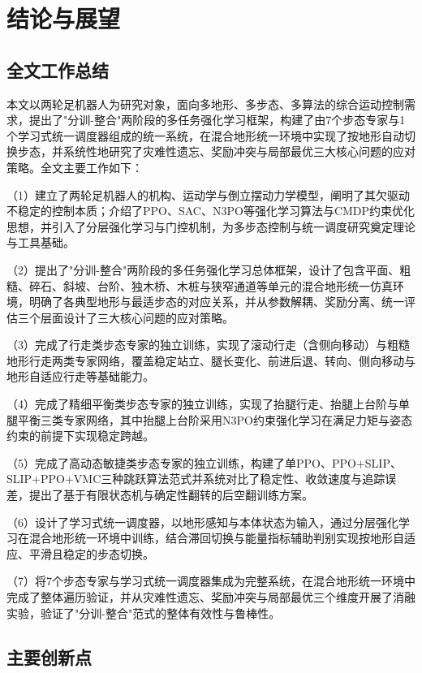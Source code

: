 
\chapter[结论与展望]{结论与展望}

\section{全文工作总结}

本文以两轮足机器人为研究对象，面向多地形、多步态、多算法的综合运动控制需求，提出了"分训-整合"两阶段的多任务强化学习框架，构建了由7个步态专家与1个学习式统一调度器组成的统一系统，在混合地形统一环境中实现了按地形自动切换步态，并系统性地研究了灾难性遗忘、奖励冲突与局部最优三大核心问题的应对策略。全文主要工作如下：

（1）建立了两轮足机器人的机构、运动学与倒立摆动力学模型，阐明了其欠驱动不稳定的控制本质；介绍了PPO、SAC、N3PO等强化学习算法与CMDP约束优化思想，并引入了分层强化学习与门控机制，为多步态控制与统一调度研究奠定理论与工具基础。

（2）提出了"分训-整合"两阶段的多任务强化学习总体框架，设计了包含平面、粗糙、碎石、斜坡、台阶、独木桥、木桩与狭窄通道等单元的混合地形统一仿真环境，明确了各典型地形与最适步态的对应关系，并从参数解耦、奖励分离、统一评估三个层面设计了三大核心问题的应对策略。

（3）完成了行走类步态专家的独立训练，实现了滚动行走（含侧向移动）与粗糙地形行走两类专家网络，覆盖稳定站立、腿长变化、前进后退、转向、侧向移动与地形自适应行走等基础能力。

（4）完成了精细平衡类步态专家的独立训练，实现了抬腿行走、抬腿上台阶与单腿平衡三类专家网络，其中抬腿上台阶采用N3PO约束强化学习在满足力矩与姿态约束的前提下实现稳定跨越。

（5）完成了高动态敏捷类步态专家的独立训练，构建了单PPO、PPO+SLIP、SLIP+PPO+VMC三种跳跃算法范式并系统对比了稳定性、收敛速度与追踪误差，提出了基于有限状态机与确定性翻转的后空翻训练方案。

（6）设计了学习式统一调度器，以地形感知与本体状态为输入，通过分层强化学习在混合地形统一环境中训练，结合滞回切换与能量指标辅助判别实现按地形自适应、平滑且稳定的步态切换。

（7）将7个步态专家与学习式统一调度器集成为完整系统，在混合地形统一环境中完成了整体遍历验证，并从灾难性遗忘、奖励冲突与局部最优三个维度开展了消融实验，验证了"分训-整合"范式的整体有效性与鲁棒性。

\section{主要创新点}

